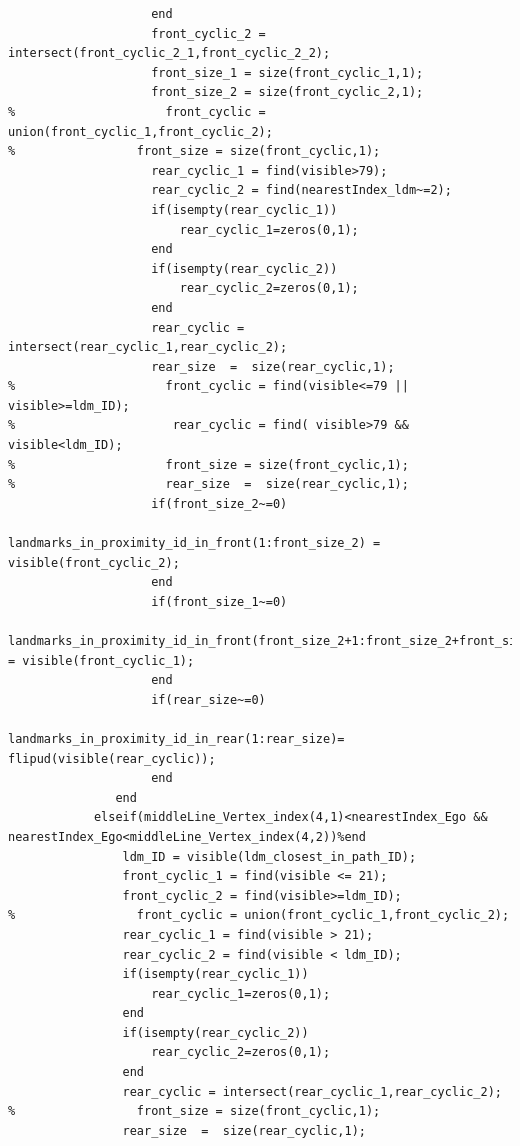 \documentclass[12pt,a4paper]{article}
\begin{document}
{{{\begin{verbatim}
                    end
                    front_cyclic_2 = intersect(front_cyclic_2_1,front_cyclic_2_2);
                    front_size_1 = size(front_cyclic_1,1);
                    front_size_2 = size(front_cyclic_2,1);
%                     front_cyclic = union(front_cyclic_1,front_cyclic_2);
%                 front_size = size(front_cyclic,1);
                    rear_cyclic_1 = find(visible>79);
                    rear_cyclic_2 = find(nearestIndex_ldm~=2);
                    if(isempty(rear_cyclic_1))
                        rear_cyclic_1=zeros(0,1);
                    end
                    if(isempty(rear_cyclic_2))
                        rear_cyclic_2=zeros(0,1);
                    end                   
                    rear_cyclic = intersect(rear_cyclic_1,rear_cyclic_2);
                    rear_size  =  size(rear_cyclic,1);
%                     front_cyclic = find(visible<=79 || visible>=ldm_ID);
%                      rear_cyclic = find( visible>79 && visible<ldm_ID);
%                     front_size = size(front_cyclic,1);
%                     rear_size  =  size(rear_cyclic,1);
                    if(front_size_2~=0)
                        landmarks_in_proximity_id_in_front(1:front_size_2) = visible(front_cyclic_2);
                    end
                    if(front_size_1~=0)
                        landmarks_in_proximity_id_in_front(front_size_2+1:front_size_2+front_size_1) = visible(front_cyclic_1);
                    end
                    if(rear_size~=0)
                        landmarks_in_proximity_id_in_rear(1:rear_size)= flipud(visible(rear_cyclic));
                    end
               end
            elseif(middleLine_Vertex_index(4,1)<nearestIndex_Ego && nearestIndex_Ego<middleLine_Vertex_index(4,2))%end
                ldm_ID = visible(ldm_closest_in_path_ID);
                front_cyclic_1 = find(visible <= 21);
                front_cyclic_2 = find(visible>=ldm_ID);
%                 front_cyclic = union(front_cyclic_1,front_cyclic_2);
                rear_cyclic_1 = find(visible > 21);
                rear_cyclic_2 = find(visible < ldm_ID);
                if(isempty(rear_cyclic_1))
                    rear_cyclic_1=zeros(0,1);
                end
                if(isempty(rear_cyclic_2))
                    rear_cyclic_2=zeros(0,1);
                end
                rear_cyclic = intersect(rear_cyclic_1,rear_cyclic_2);
%                 front_size = size(front_cyclic,1);
                rear_size  =  size(rear_cyclic,1);
              

\end{verbatim}}}}
\end{document}

